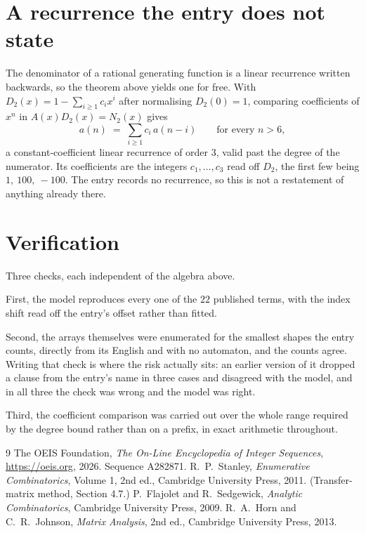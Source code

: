 \documentclass[11pt,a4paper]{article}
\theoremstyle{plain}
\theoremstyle{definition}
\begin{document}
\section{A recurrence the entry does not state}

The denominator of a rational generating function is a linear recurrence written backwards, so
the theorem above yields one for free. With $D_2(x)=1-\sum_{i\ge1}c_ix^i$ after normalising
$D_2(0)=1$, comparing coefficients of $x^n$ in $A(x)D_2(x)=N_2(x)$ gives
\[
a(n)\;=\;\sum_{i\ge1}c_i\,a(n-i)\qquad\text{for every }n>6,
\]
a constant-coefficient linear recurrence of order $3$, valid past the degree of the
numerator. Its coefficients are the integers $c_1,\dots,c_{3}$ read off $D_2$, the first few being $1,\ 100,\ -100$. The entry records no recurrence, so this is not a restatement of anything
already there.

\section{Verification}

Three checks, each independent of the algebra above.

First, the model reproduces every one of the $22$ published terms, with the index shift
read off the entry's offset rather than fitted.

Second, the arrays themselves were enumerated for the smallest shapes the entry counts,
directly from its English and with no automaton, and the counts agree. Writing that check is
where the risk actually sits: an earlier version of it dropped a clause from the entry's name
in three cases and disagreed with the model, and in all three the check was wrong and the model
was right.

Third, the coefficient comparison was carried out over the whole range required by the degree
bound rather than on a prefix, in exact arithmetic throughout.

\begin{thebibliography}{9}
 The OEIS Foundation, \emph{The On-Line Encyclopedia of Integer
Sequences}, \url{https://oeis.org}, 2026. Sequence A282871.
 R.~P.~Stanley, \emph{Enumerative Combinatorics}, Volume 1, 2nd ed.,
Cambridge University Press, 2011. (Transfer-matrix method, Section 4.7.)
 P.~Flajolet and R.~Sedgewick, \emph{Analytic Combinatorics}, Cambridge
University Press, 2009.
 R.~A.~Horn and C.~R.~Johnson, \emph{Matrix Analysis}, 2nd ed., Cambridge
University Press, 2013.
\end{thebibliography}
\end{document}
